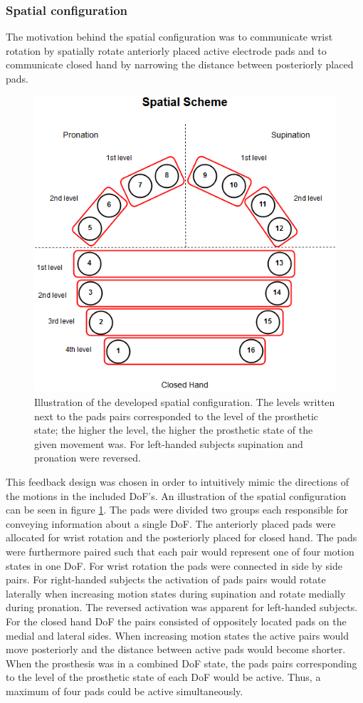 \subsubsection{Spatial configuration}
The motivation behind the spatial configuration was to communicate wrist rotation by spatially rotate anteriorly placed active electrode pads and to communicate closed hand by narrowing the distance between posteriorly placed pads. 
\begin{figure}[h]                 
	\includegraphics[width=.8\textwidth]{figures/El_array_spatial}  
	\caption{Illustration of the developed spatial configuration. The levels written next to the pads pairs corresponded to the level of the prosthetic state; the higher the level, the higher the prosthetic state of the given movement was. For left-handed subjects supination and pronation were reversed.}
	\label{fig:pa:spatial} 
\end{figure}

This feedback design was chosen in order to intuitively mimic the directions of the motions in the included DoF's. An illustration of the spatial configuration can be seen in figure \ref{fig:pa:spatial}. The pads were divided two groups each responsible for conveying information about a single DoF. The anteriorly placed pads were allocated for wrist rotation and the posteriorly placed for closed hand. The pads were furthermore paired such that each pair would represent one of four motion states in one DoF. For wrist rotation the pads were connected in side by side pairs. For right-handed subjects the activation of pads pairs would rotate laterally when increasing motion states during supination and rotate medially during pronation. The reversed activation was apparent for left-handed subjects. For the closed hand DoF the pairs consisted of oppositely located pads on the medial and lateral sides. When increasing motion states the active pairs would move posteriorly and the distance between active pads would become shorter. When the prosthesis was in a combined DoF state, the pads pairs corresponding to the level of the prosthetic state of each DoF would be active. Thus, a maximum of four pads could be active simultaneously. 

